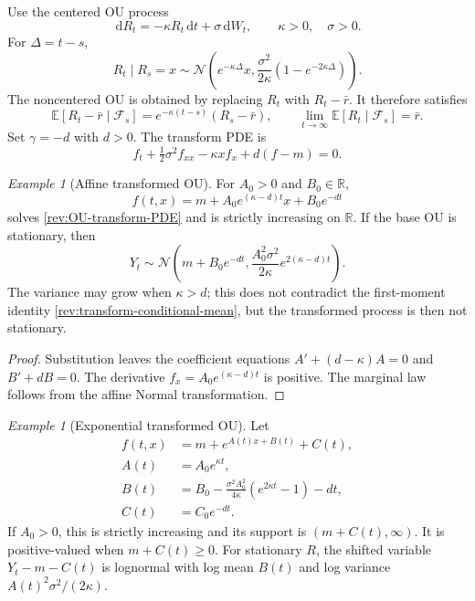 \documentclass[11pt]{article}
\theoremstyle{remark}
\newtheorem{example}[definition]{Example}
\newcommand{\E}{\mathbb E}
\newcommand{\R}{\mathbb R}
\newcommand{\dd}{\,\mathrm d}
\newcommand{\Normal}{\mathcal N}
\begin{document}
Use the centered OU process
\begin{equation}
\dd R_t=-\kappa R_t\dd t+\sigma\dd W_t,
\qquad \kappa>0,\quad\sigma>0.
\label{rev:OU}
\end{equation}
For $\Delta=t-s$,
\begin{equation}
R_t\mid R_s=x\sim
\Normal\!\left(e^{-\kappa\Delta}x,
\frac{\sigma^2}{2\kappa}(1-e^{-2\kappa\Delta})\right).
\label{rev:OU-transition}
\end{equation}
The noncentered OU is obtained by replacing $R_t$ with $R_t-\bar r$.
It therefore satisfies
\begin{equation}
\E[R_t-\bar r\mid\mathcal F_s]
=e^{-\kappa(t-s)}(R_s-\bar r),
\qquad
\lim_{t\to\infty}\E[R_t\mid\mathcal F_s]=\bar r.
\label{rev:OU-conditional-mean}
\end{equation}
Set $\gamma=-d$ with $d>0$.  The transform PDE is
\begin{equation}
f_t+\tfrac12\sigma^2f_{xx}-\kappa xf_x+d(f-m)=0.
\label{rev:OU-transform-PDE}
\end{equation}

\begin{example}[Affine transformed OU]
\label{rev:ex-affine-OU}
For $A_0>0$ and $B_0\in\R$,
\begin{equation}
f(t,x)=m+A_0e^{(\kappa-d)t}x+B_0e^{-dt}
\label{rev:affine-OU-transform}
\end{equation}
solves \eqref{rev:OU-transform-PDE} and is strictly increasing on $\R$.
If the base OU is stationary, then
\begin{equation}
Y_t\sim\Normal\!\left(m+B_0e^{-dt},
\frac{A_0^2\sigma^2}{2\kappa}e^{2(\kappa-d)t}\right).
\label{rev:affine-OU-margin}
\end{equation}
The variance may grow when $\kappa>d$; this does not contradict the first-moment
identity \eqref{rev:transform-conditional-mean}, but the transformed process is
then not stationary.
\end{example}

\begin{proof}
Substitution leaves the coefficient equations
$A'+(d-\kappa)A=0$ and $B'+dB=0$.  The derivative
$f_x=A_0e^{(\kappa-d)t}$ is positive.  The marginal law follows from the affine
Normal transformation.
\end{proof}

\begin{example}[Exponential transformed OU]
\label{rev:ex-exponential-OU}
Let
\begin{align}
f(t,x)&=m+e^{A(t)x+B(t)}+C(t),\label{rev:exp-OU-transform}\\
A(t)&=A_0e^{\kappa t},\label{rev:exp-OU-A}\\
B(t)&=B_0-\frac{\sigma^2A_0^2}{4\kappa}
             (e^{2\kappa t}-1)-dt,\label{rev:exp-OU-B}\\
C(t)&=C_0e^{-dt}.\label{rev:exp-OU-C}
\end{align}
If $A_0>0$, this is strictly increasing and its support is
$(m+C(t),\infty)$.  It is positive-valued when $m+C(t)\ge0$.  For stationary
$R$, the shifted variable $Y_t-m-C(t)$ is lognormal with log mean $B(t)$ and
log variance $A(t)^2\sigma^2/(2\kappa)$.
\end{example}
\end{document}
